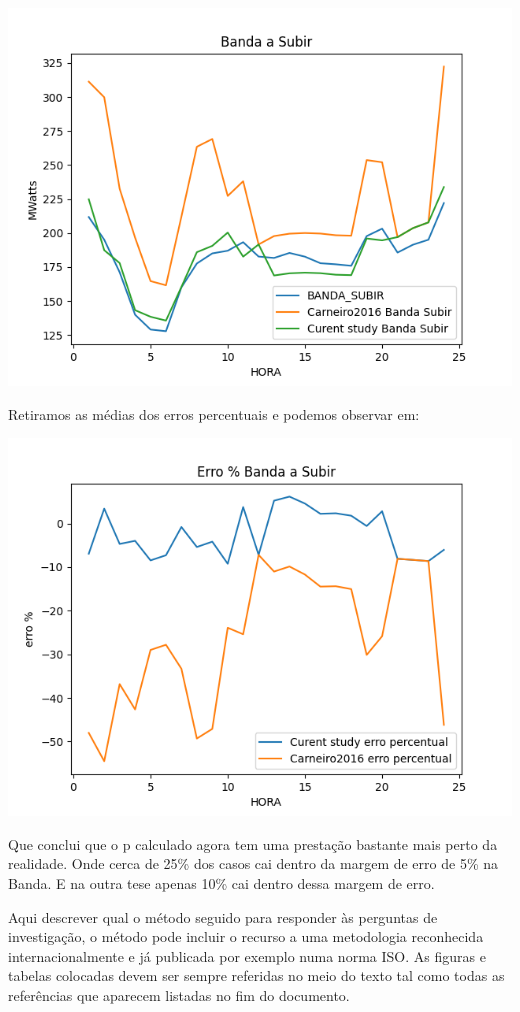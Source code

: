 \includegraphics{Imagens/Banda a Subir.png}

Retiramos as médias dos erros percentuais e podemos observar em:

\includegraphics{Imagens/Erro per Banda a Subir.png}

Que conclui que o p calculado agora tem uma prestação bastante mais perto da realidade. 
Onde cerca de 25\% dos casos cai dentro da margem de erro de 5\% na Banda. E na outra tese apenas 10\% cai dentro dessa margem de erro.



Aqui descrever qual o método seguido para responder às perguntas de investigação, o método pode incluir o recurso a uma metodologia reconhecida internacionalmente e já publicada por exemplo numa norma ISO\cite{fet_skaar_2006}.
As figuras e tabelas colocadas devem ser sempre referidas no meio do texto tal como todas as referências que aparecem listadas no fim do documento. 



